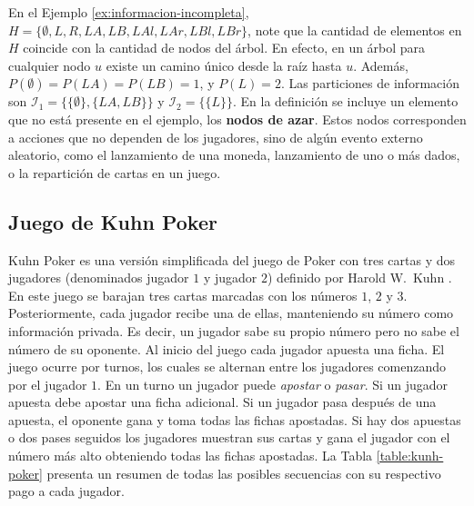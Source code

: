 En el Ejemplo \ref{ex:informacion-incompleta}, $H = \{ \emptyset, L, R, LA, LB, LAl, LAr, LBl, LBr\}$, note que la cantidad de elementos en $H$ coincide con la cantidad de nodos del árbol. En efecto, en un árbol para cualquier nodo $u$ existe un camino único desde la raíz hasta $u$. Además, $P(\emptyset) = P(LA) = P(LB) = 1$, y $P(L) = 2$. Las particiones de información son $\mathcal{I}_1 = \{\{\emptyset\}, \{LA, LB\}\}$ y $\mathcal{I}_2  = \{\{L\}\}$. En la definición se incluye un elemento que no está presente en el ejemplo, los \textbf{nodos de azar}. Estos nodos corresponden a acciones que no dependen de los jugadores, sino de algún evento externo aleatorio, como el lanzamiento de una moneda, lanzamiento de uno o más dados, o la repartición de cartas en un juego.

\subsection{Juego de Kuhn Poker}
\label{section:kuhn-poker}

Kuhn Poker es una versión simplificada del juego de Poker con tres cartas y dos jugadores (denominados jugador $1$ y jugador $2$) definido por Harold W.\ Kuhn \cite{bib:kuhn-poker}. En este juego se barajan tres cartas marcadas con los números $1$, $2$ y $3$. Posteriormente, cada jugador recibe una de ellas, manteniendo su número como información privada. Es decir, un jugador sabe su propio número pero no sabe el número de su oponente. Al inicio del juego cada jugador apuesta una ficha. El juego ocurre por turnos, los cuales se alternan entre los jugadores comenzando por el jugador $1$. En un turno un jugador puede \textit{apostar} o \textit{pasar}. Si un jugador apuesta debe apostar una ficha adicional. Si un jugador pasa después de una apuesta, el oponente gana y toma todas las fichas apostadas. Si hay dos apuestas o dos pases seguidos los jugadores muestran sus cartas y gana el jugador con el número más alto obteniendo todas las fichas apostadas. La Tabla \ref{table:kunh-poker} presenta un resumen de todas las posibles secuencias con su respectivo pago a cada jugador.

